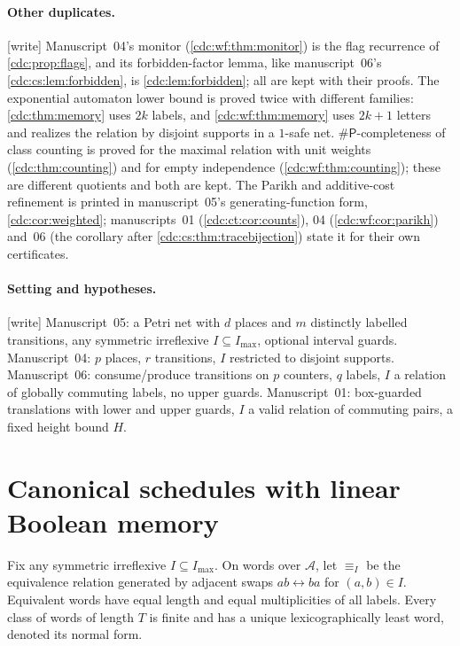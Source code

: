 \documentclass[11pt,a4paper]{article}
\theoremstyle{definition}
\theoremstyle{remark}
\newcommand{\A}{\mathcal A}
\newcommand{\sharpP}{\mathsf{\#P}}
\newcommand{\wtag}{\textup{[write]}}%
\newcommand{\srctag}[1]{\texorpdfstring{\hspace{0.5em}{\normalfont\small\color{accent}[#1]}}{ [#1]}}
\begin{document}
\paragraph{Other duplicates.} \wtag{} Manuscript~04's monitor (\cref{cdc:wf:thm:monitor}) is the flag recurrence of \cref{cdc:prop:flags}, and its forbidden-factor lemma, like manuscript~06's \cref{cdc:cs:lem:forbidden}, is \cref{cdc:lem:forbidden}; all are kept with their proofs. The exponential automaton lower bound is proved twice with different families: \cref{cdc:thm:memory} uses $2k$ labels, and \cref{cdc:wf:thm:memory} uses $2k+1$ letters and realizes the relation by disjoint supports in a $1$-safe net. $\sharpP$-completeness of class counting is proved for the maximal relation with unit weights (\cref{cdc:thm:counting}) and for empty independence (\cref{cdc:wf:thm:counting}); these are different quotients and both are kept. The Parikh and additive-cost refinement is printed in manuscript~05's generating-function form, \cref{cdc:cor:weighted}; manuscripts~01 (\cref{cdc:ct:cor:counts}), 04 (\cref{cdc:wf:cor:parikh}) and~06 (the corollary after \cref{cdc:cs:thm:tracebijection}) state it for their own certificates.

\paragraph{Setting and hypotheses.} \wtag{} Manuscript~05: a Petri net with $d$ places and $m$ distinctly labelled transitions, any symmetric irreflexive $I\subseteq I_{\max}$, optional interval guards. Manuscript~04: $p$ places, $r$ transitions, $I$ restricted to disjoint supports. Manuscript~06: consume/produce transitions on $p$ counters, $q$ labels, $I$ a relation of globally commuting labels, no upper guards. Manuscript~01: box-guarded translations with lower and upper guards, $I$ a valid relation of commuting pairs, a fixed height bound $H$.

\section{Canonical schedules with linear Boolean memory\srctag{05}}
\label{cdc:sec:normal}
Fix any symmetric irreflexive $I\subseteq I_{\max}$. On words over $\A$, let $\equiv_I$ be the equivalence relation generated by adjacent swaps $ab\leftrightarrow ba$ for $(a,b)\in I$. Equivalent words have equal length and equal multiplicities of all labels. Every class of words of length $T$ is finite and has a unique lexicographically least word, denoted its normal form.
\end{document}
